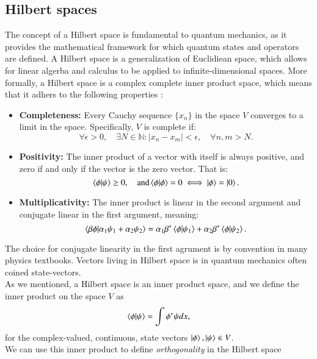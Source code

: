 \documentclass{subfiles}
\begin{document}
\subsection{Hilbert spaces}\label{sec:Hilbert_space}
The concept of a Hilbert space is fundamental to quantum mechanics, as it provides the mathematical framework for which quantum states and operators are defined. A Hilbert space is a generalization of Euclidiean space, which allows for linear algerba and calculus to be applied to infinite-dimensional spaces. More formally, a Hilbert space is a complex complete inner product space, which means that it adhers to the following properties \cite{griffiths2018introduction, berera2021quantum}: 
\begin{itemize}
    \item \textbf{Completeness:} Every Cauchy sequence $\{x_n\}$ in the space $V$ converges to a limit in the space. Specifically, $V$ is complete if:
    \begin{equation}
        \forall \epsilon > 0,\quad \exists N \in \mathbb{N} : |x_n - x_m| < \epsilon, \quad \forall n,m > N.
    \end{equation}
    \item \textbf{Positivity:} The inner product of a vector with itself is always positive, and zero if and only if the vector is the zero vector. That is:
    \begin{equation}
        \braket{\phi|\psi}\geq 0, \quad \text{and} \braket{\phi|\phi} = 0 \iff \ket{\phi} = \ket{0}. 
    \end{equation}
    \item \textbf{Multiplicativity:} The inner product is linear in the second argument and conjugate linear in the first argument, meaning:
    \begin{equation}
        \braket{\beta\phi|\alpha_1\psi_1 + \alpha_2\psi_2} = \alpha_1\beta^*\braket{\phi|\psi_1} + \alpha_2\beta^*\braket{\phi|\psi_2}. 
    \end{equation}
\end{itemize}
The choice for conjugate linearity in the first agrument is by convention in many physics textbooks. Vectors living in Hilbert space is in quantum mechanics often coined state-vectors. \\ As we mentioned, a Hilbert space is an inner product space, and we define the inner product on the space $V$ as
\begin{align*}
    \braket{\phi|\psi} = \int \phi^* \psi dx,
\end{align*}
for the complex-valued, continuous, state vectors $\ket{\phi}, \ket{\psi} \in V$. \\ We can use this inner product to define \emph{orthogonality} in the Hilbert space
\end{document}
